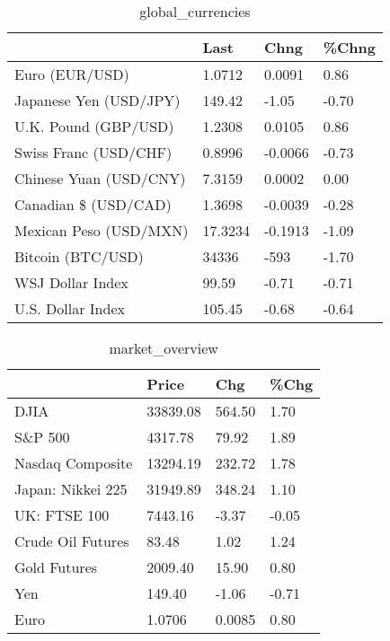 \documentclass{article}%
\begin{document}
%


\begin{table}[htbp]%
\caption{global\_currencies}%
\centering%
\begin{adjustbox}{width=1\textwidth}%
\begin{tabular}{llll}
\toprule
                       &    Last &    Chng & \%Chng \\
\midrule
        Euro (EUR/USD) &  1.0712 &  0.0091 &  0.86 \\
Japanese Yen (USD/JPY) &  149.42 &   -1.05 & -0.70 \\
  U.K. Pound (GBP/USD) &  1.2308 &  0.0105 &  0.86 \\
 Swiss Franc (USD/CHF) &  0.8996 & -0.0066 & -0.73 \\
Chinese Yuan (USD/CNY) &  7.3159 &  0.0002 &  0.00 \\
  Canadian \$ (USD/CAD) &  1.3698 & -0.0039 & -0.28 \\
Mexican Peso (USD/MXN) & 17.3234 & -0.1913 & -1.09 \\
     Bitcoin (BTC/USD) &   34336 &    -593 & -1.70 \\
      WSJ Dollar Index &   99.59 &   -0.71 & -0.71 \\
     U.S. Dollar Index &  105.45 &   -0.68 & -0.64 \\
\bottomrule
\end{tabular}
%
\end{adjustbox}%
\end{table}

%


\begin{table}[htbp]%
\caption{market\_overview}%
\centering%
\begin{adjustbox}{width=1\textwidth}%
\begin{tabular}{llll}
\toprule
                  &    Price &    Chg &  \%Chg \\
\midrule
             DJIA & 33839.08 & 564.50 &  1.70 \\
          S\&P 500 &  4317.78 &  79.92 &  1.89 \\
 Nasdaq Composite & 13294.19 & 232.72 &  1.78 \\
Japan: Nikkei 225 & 31949.89 & 348.24 &  1.10 \\
     UK: FTSE 100 &  7443.16 &  -3.37 & -0.05 \\
Crude Oil Futures &    83.48 &   1.02 &  1.24 \\
     Gold Futures &  2009.40 &  15.90 &  0.80 \\
              Yen &   149.40 &  -1.06 & -0.71 \\
             Euro &   1.0706 & 0.0085 &  0.80 \\
\bottomrule
\end{tabular}
%
\end{adjustbox}%
\end{table}

%
\end{document}
